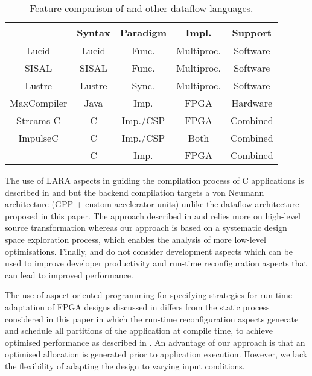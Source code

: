 \begin{table}[!h]
  \renewcommand{\arraystretch}{1.4}
  \centering
  \caption{Feature comparison of \MAXC{} and other dataflow languages.}
  \label{table:feature-comparison}
  \begin{tabular}{ c |  c |  c |  c |  c }
    \hline
    \           & \bf{Syntax} & \bf{Paradigm} & \bf{Impl.} & \bf{Support} \\
    \hline \hline
    Lucid       & Lucid       & Func.         & Multiproc. & Software     \\
    SISAL       & SISAL       & Func.         & Multiproc. & Software     \\
    Lustre      & Lustre      & Sync.         & Multiproc. & Software     \\
    MaxCompiler & Java        & Imp.          & FPGA       & Hardware     \\
    Streams-C   & C           & Imp./CSP      & FPGA       & Combined     \\
    ImpulseC    & C           & Imp./CSP      & Both       & Combined     \\
    \MAXC{}     & C           & Imp.          & FPGA       & Combined     \\
  \end{tabular}
\end{table}

The use of LARA aspects in guiding the compilation process of C
applications is described in
\cite{Cardoso:Teixeira:Alves:Nobre:Diniz:Cutinho:Luk:2012} and
\cite{cardoso2011new} but the backend compilation targets a von
Neumann architecture (GPP + custom accelerator units) unlike the
dataflow architecture proposed in this paper. The approach described
in \cite{Cardoso:Teixeira:Alves:Nobre:Diniz:Cutinho:Luk:2012} and
\cite{cardoso2011new} relies more on high-level source transformation
whereas our approach is based on a systematic design space exploration
process, which enables the analysis of more low-level
optimisations. Finally,
\cite{Cardoso:Teixeira:Alves:Nobre:Diniz:Cutinho:Luk:2012} and
\cite{cardoso2011new} do not consider development aspects which can be
used to improve developer productivity and run-time reconfiguration
aspects that can lead to improved performance.

The use of aspect-oriented programming for specifying strategies for
run-time adaptation of FPGA designs discussed in \cite{6322875}
differs from the static process considered in this paper in which the
run-time reconfiguration aspects generate and schedule all partitions
of the application at compile time, to achieve optimised performance
as described in \cite{Xinyu:Qiwei:Luk:Qiang:Pell:2012}. An advantage
of our approach is that an optimised allocation is generated prior to
application execution. However, we lack the flexibility of adapting the
design to varying input conditions.
